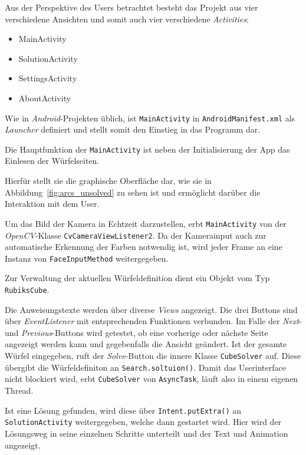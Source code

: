 Aus der Perspektive des Users betrachtet besteht das Projekt aus vier
verschiedene Ansichten und somit auch vier verschiedene \emph{Activities}:

\begin{itemize}
  \item MainActivity
  \item SolutionActivity
  \item SettingsActivity
  \item AboutActivity
\end{itemize}

Wie in \emph{Android}-Projekten üblich, ist \texttt{MainActivity} in
\texttt{AndroidManifest.xml} als \emph{Launcher} definiert und stellt somit den
Einstieg in das Programm dar.

Die Hauptfunktion der \texttt{MainActivity} ist neben der Initialisierung der
App das Einlesen der Würfelseiten.

Hierfür stellt sie die graphische Oberfläche dar, wie sie in
Abbildung~\ref{fig:arcs_unsolved} zu sehen ist und ermöglicht darüber die
Interaktion mit dem User.

Um das Bild der Kamera in Echtzeit darzustellen, erbt \texttt{MainActivity} von
der \emph{OpenCV}-Klasse \texttt{CvCameraViewListener2}. Da der Kamerainput auch
zur automatische Erkennung der Farben notwendig ist, wird jeder Frame an eine
Instanz von \texttt{FaceInputMethod} weitergegeben.

Zur Verwaltung der aktuellen Würfeldefinition dient ein Objekt vom Typ
\texttt{RubiksCube}.

Die Anweisungstexte werden über diverse \emph{Views} angezeigt. Die drei Buttons
sind über \emph{EventListener} mit entsprechenden Funktionen verbunden. Im Falle
der \emph{Next}- und \emph{Previous}-Buttons wird getestet, ob eine vorherige
oder nächste Seite angezeigt werden kann und gegebenfalls die Ansicht geändert.
Ist der gesamte Würfel eingegeben, ruft der \emph{Solve}-Button die innere
Klasse \texttt{CubeSolver} auf. Diese übergibt die Würfeldefiniton an
\texttt{Search.soltuion()}. Damit das Userinterface nicht blockiert wird, erbt
\texttt{CubeSolver} von \texttt{AsyncTask}, läuft also in einem eigenen Thread.

Ist eine Lösung gefunden, wird diese über \texttt{Intent.putExtra()} an
\texttt{SolutionActivity} weitergegeben, welche dann gestartet wird. Hier wird
der Lösungsweg in seine einzelnen Schritte unterteilt und der Text und Animation
angezeigt.

